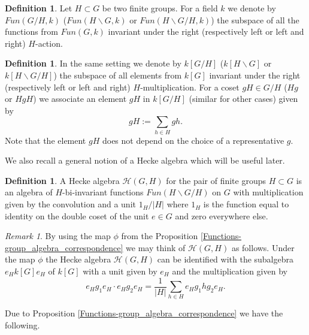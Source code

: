 \documentclass[12pt,reqno]{amsart}
\theoremstyle{definition}
\newtheorem{defn}[thm]{Definition}
\theoremstyle{remark}
\newtheorem{rem}[thm]{Remark}
\numberwithin{equation}{section}
\begin{document}
\begin{defn}
    Let $H\subset G$ be two finite groups. For a field $k$ we denote by $Fun(G/H,k)$ ($Fun(H\backslash G,k)$ or $Fun(H\backslash G /H,k)$) the subspace of all the functions from $Fun(G,k)$ invariant under the right (respectively left or left and right) $H$-action.\\
\end{defn}

\begin{defn}
    In the same setting we denote by $k[G/H]$ ($k[H\backslash G]$ or $k[H\backslash G/H]$) the subspace of all elements from $k[G]$ invariant under the right (respectively left or left and right) $H$-multiplication. For a coset $gH\in G/H$ ($Hg$ or $HgH$) we associate an element $gH$ in $k[G/H]$ (similar for other cases) given by
    \begin{equation*}
        gH:=\sum_{h\in H} gh.
    \end{equation*}
    Note that the element $gH$ does not depend on the choice of a representative $g$.
\end{defn}

We also recall a general notion of a Hecke algebra which will be useful later.

\begin{defn}\label{finite_group_Hecke_algebra}
    A Hecke algebra $\mathcal{H}(G,H)$ for the pair of finite groups $H\subset G$ is an algebra of $H$-bi-invariant functions $Fun(H\backslash G/H)$ on $G$ with multiplication given by the convolution and a unit $1_H/|H|$ where $1_H$ is the function equal to identity on the double coset of the unit $e\in G$ and zero everywhere else.
\end{defn}

\begin{rem}\label{convol_Hecke_alg}
    By using the map $\phi$ from the Proposition \ref{Functions-group_algebra_correspondence} we may think of $\mathcal{H}(G,H)$ as follows.
    Under the map $\phi$ the Hecke algebra $\mathcal{H}(G,H)$ can be identified with the subalgebra $e_H k[G] e_H$ of $k[G]$ with a unit given by $e_H$ and the multiplication given by
    \begin{equation*}
        e_H g_1 e_H \cdot e_H g_2 e_H = \frac{1}{|H|} \sum_{h\in H} e_H g_1hg_2 e_H .
    \end{equation*}
\end{rem}
Due to Proposition \ref{Functions-group_algebra_correspondence} we have the following.\\
\end{document}
